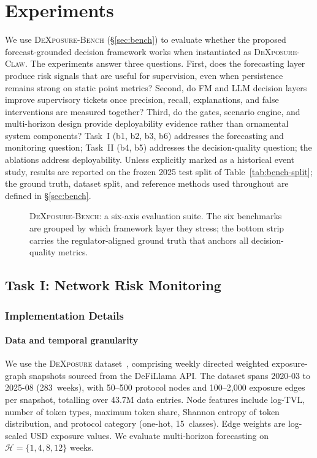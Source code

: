 \section{Experiments}
\label{sec:exp}

We use \textsc{DeXposure-Bench} (\S\ref{sec:bench}) to evaluate whether the proposed forecast-grounded decision framework works when instantiated as \textsc{DeXposure-Claw}. The experiments answer three questions. First, does the forecasting layer produce risk signals that are useful for supervision, even when persistence remains strong on static point metrics? Second, do FM and LLM decision layers improve supervisory tickets once precision, recall, explanations, and false interventions are measured together? Third, do the gates, scenario engine, and multi-horizon design provide deployability evidence rather than ornamental system components? Task~I (b1, b2, b3, b6) addresses the forecasting and monitoring question; Task~II (b4, b5) addresses the decision-quality question; the ablations address deployability. Unless explicitly marked as a historical event study, results are reported on the frozen 2025 test split of Table~\ref{tab:bench-split}; the ground truth, dataset split, and reference methods used throughout are defined in \S\ref{sec:bench}.

\begin{figure}[!t]
    \centering
    \resizebox{0.95\textwidth}{!}{}
    \caption{\textsc{DeXposure-Bench}: a six-axis evaluation suite. The six benchmarks are grouped by which framework layer they stress; the bottom strip carries the regulator-aligned ground truth that anchors all decision-quality metrics.}
    \label{fig:eval_framework}
\end{figure}

\subsection{Task I: Network Risk Monitoring}

\subsubsection{Implementation Details}
\label{sssec:impl_task1}

\paragraph{Data and temporal granularity}
We use the \textsc{DeXposure} dataset~\cite{wu2025dexposuredatasetbenchmarksinterprotocol}, comprising weekly directed weighted exposure-graph snapshots sourced from the DeFiLlama API. The dataset spans 2020-03 to 2025-08 (283~weeks), with 50--500 protocol nodes and 100--2{,}000 exposure edges per snapshot, totalling over 43.7M data entries. Node features include log-TVL, number of token types, maximum token share, Shannon entropy of token distribution, and protocol category (one-hot, 15~classes). Edge weights are log-scaled USD exposure values. We evaluate multi-horizon forecasting on $\mathcal{H}=\{1,4,8,12\}$ weeks.

